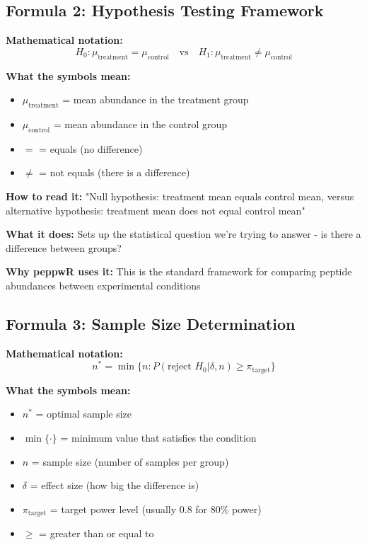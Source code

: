 \documentclass[11pt]{article}
\begin{document}
\subsection{Formula 2: Hypothesis Testing Framework}

\textbf{Mathematical notation:}
\[H_0: \mu_{\text{treatment}} = \mu_{\text{control}} \quad \text{vs} \quad H_1: \mu_{\text{treatment}} \neq \mu_{\text{control}}\]

\textbf{What the symbols mean:}
\begin{itemize}
\item $\mu_{\text{treatment}}$ = mean abundance in the treatment group
\item $\mu_{\text{control}}$ = mean abundance in the control group
\item $=$ = equals (no difference)
\item $\neq$ = not equals (there is a difference)
\end{itemize}

\textbf{How to read it:} "Null hypothesis: treatment mean equals control mean, versus alternative hypothesis: treatment mean does not equal control mean"

\textbf{What it does:} Sets up the statistical question we're trying to answer - is there a difference between groups?

\textbf{Why peppwR uses it:} This is the standard framework for comparing peptide abundances between experimental conditions

\subsection{Formula 3: Sample Size Determination}

\textbf{Mathematical notation:}
\[n^* = \min\{n : P(\text{reject } H_0 | \delta, n) \geq \pi_{\text{target}}\}\]

\textbf{What the symbols mean:}
\begin{itemize}
\item $n^*$ = optimal sample size
\item $\min\{\cdot\}$ = minimum value that satisfies the condition
\item $n$ = sample size (number of samples per group)
\item $\delta$ = effect size (how big the difference is)
\item $\pi_{\text{target}}$ = target power level (usually 0.8 for 80\% power)
\item $\geq$ = greater than or equal to
\end{itemize}
\end{document}
